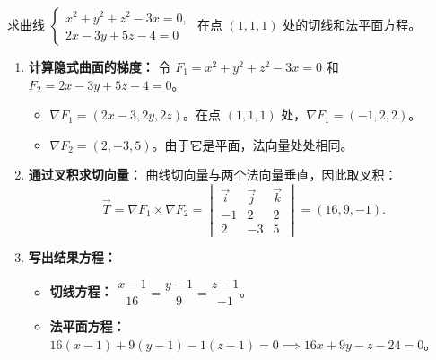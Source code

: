 \documentclass[lang=cn,11pt]{elegantbook}
\begin{document}
\begin{exercise}[隐式交线切线一]
求曲线 $\begin{cases} x^2+y^2+z^2-3x=0, \\ 2x-3y+5z-4=0 \end{cases}$ 在点 $(1,1,1)$ 处的切线和法平面方程。
\end{exercise}
\begin{solution}
\begin{enumerate}
    \item \textbf{计算隐式曲面的梯度：}
    令 $F_1 = x^2+y^2+z^2-3x = 0$ 和 $F_2 = 2x-3y+5z-4 = 0$。
    \begin{itemize}
        \item $\nabla F_1 = (2x-3, 2y, 2z)$。在点 $(1,1,1)$ 处，$\nabla F_1 = (-1, 2, 2)$。
        \item $\nabla F_2 = (2, -3, 5)$。由于它是平面，法向量处处相同。
    \end{itemize}

    \item \textbf{通过叉积求切向量：}
    曲线切向量与两个法向量垂直，因此取叉积：
    \[ \vec{T} = \nabla F_1 \times \nabla F_2 = \begin{vmatrix} \vec{i} & \vec{j} & \vec{k} \\ -1 & 2 & 2 \\ 2 & -3 & 5 \end{vmatrix} = (16, 9, -1). \]

    \item \textbf{写出结果方程：}
    \begin{itemize}
        \item \textbf{切线方程：} $\dfrac{x-1}{16} = \dfrac{y-1}{9} = \dfrac{z-1}{-1}$。
        \item \textbf{法平面方程：} $16(x-1) + 9(y-1) - 1(z-1) = 0 \implies 16x+9y-z-24=0$。
    \end{itemize}
\end{enumerate}
\end{solution}
\end{document}
